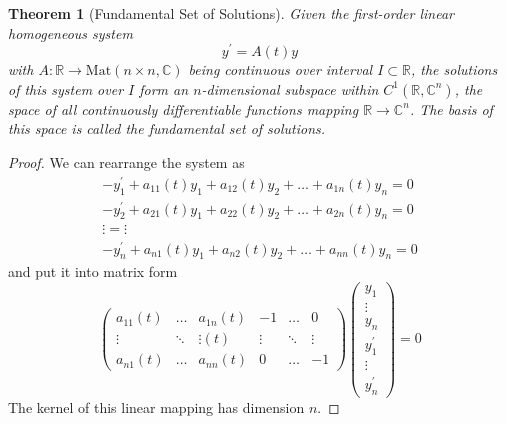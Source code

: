 \documentclass{article}
\newtheorem{theorem}{Theorem}[section]
\theoremstyle{remark}
\theoremstyle{definition}
\begin{document}
      \begin{theorem}[Fundamental Set of Solutions]
      Given the first-order linear homogeneous system 
      \[y^\prime = A(t) y\]
      with $A: \mathbb{R} \longrightarrow \text{Mat}(n \times n, \mathbb{C})$ being continuous over interval $I \subset \mathbb{R}$, the solutions of this system over $I$ form an $n$-dimensional subspace within $C^1(\mathbb{R}, \mathbb{C}^n)$, the space of all continuously differentiable functions mapping $\mathbb{R} \longrightarrow \mathbb{C}^n$. The basis of this space is called the \textit{fundamental set of solutions}. 
      \end{theorem}
      \begin{proof}
      We can rearrange the system as 
      \begin{align*}
          -y_1^\prime + a_{11}(t) y_1 + a_{12}(t) y_2 + \ldots + a_{1n}(t) y_n = 0 \\
          -y_2^\prime + a_{21}(t) y_1 + a_{22}(t) y_2 + \ldots + a_{2n}(t) y_n = 0 \\
          \vdots = \vdots \\
          -y_n^\prime + a_{n1}(t) y_1 + a_{n2}(t) y_2 + \ldots + a_{nn}(t) y_n = 0 
      \end{align*}
      and put it into matrix form
      \[\begin{pmatrix}
      a_{11}(t) & \ldots & a_{1n} (t) & -1 & \ldots & 0 \\
      \vdots & \ddots &\vdots (t) & \vdots & \ddots& \vdots \\
      a_{n1}(t) & \ldots & a_{nn} (t) & 0 & \ldots & -1 
      \end{pmatrix} \begin{pmatrix}y_1  \\ \vdots \\ y_n \\ y_1^\prime \\ \vdots \\ y_n^\prime \end{pmatrix} = 0\]
      The kernel of this linear mapping has dimension $n$. 
      \end{proof}
\end{document}
